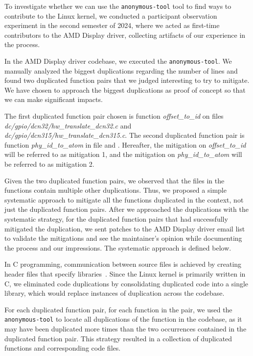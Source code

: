 \documentclass[10pt,conference]{IEEEtran}
\begin{document}
To investigate whether we can use the \texttt{anonymous-tool} tool to find ways to contribute to the Linux kernel, we conducted a participant observation experiment in the second semester of 2024, where we acted as first-time contributors to the AMD Display driver, collecting artifacts of our experience in the process.

In the AMD Display driver codebase, we executed the \texttt{anonymous-tool}. We manually analyzed the biggest duplications regarding the number of lines and found two duplicated function pairs that we judged interesting to try to mitigate. We have chosen to approach the biggest duplications as proof of concept so that we can make significant impacts. 

The first duplicated function pair chosen is function \textit{offset\_to\_id} on files \textit{dc/gpio/dcn32/hw\_translate\_dcn32.c} and \textit{dc/gpio/dcn315/hw\_translate\_dcn315.c}. The second duplicated function pair is function \textit{phy\_id\_to\_atom} in file 
\textit{ } and \textit{}.
Hereafter, the mitigation on \textit{offset\_to\_id} will be referred to as mitigation 1, and the mitigation on 
\textit{phy\_id\_to\_atom} will be referred to as mitigation 2.



Given the two duplicated function pairs, we observed that the files in the functions 
contain multiple other duplications. Thus, we proposed a simple systematic approach 
to mitigate all the functions duplicated in the context, not just the duplicated 
function pairs. 
After we approached the duplications with the systematic strategy, for the duplicated 
function pairs that had successfully mitigated the duplication, we sent patches to the 
AMD Display driver email list to validate the mitigations and see the maintainer's opinion 
while documenting the process and our impressions.
The systematic approach is defined below. 

In C programming, communication between source files is achieved by creating header files that specify 
libraries~\cite{Cbook}. Since the Linux kernel is primarily written in C, we eliminated code duplications 
by consolidating duplicated code into a single library, which would replace instances of 
duplication across the codebase.

For each duplicated function pair, for each function in the pair, we used the \texttt{anonymous-tool} to locate all duplications of the function in the codebase, as it may have been duplicated more times than the two occurrences contained in the duplicated function pair. 
This strategy resulted in a collection of duplicated functions and corresponding code files.
\end{document}
